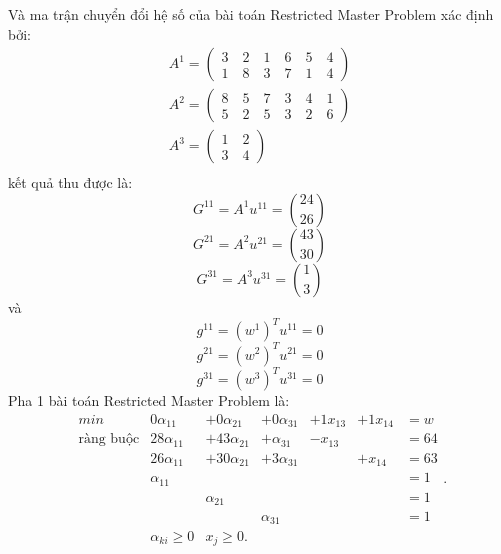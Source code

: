 Và ma trận chuyển đổi hệ số của bài toán Restricted Master Problem xác định bởi:
\begin{displaymath}
\begin{array}{llll}
 A^1 = \left(\begin{matrix} 3\quad 2\quad 1\quad 6 \quad5 \quad 4\\1\quad 8\quad 3\quad 7\quad1\quad 4\end{matrix} \right)\\
 A^2 = \left(\begin{matrix} 8\quad 5\quad 7\quad 3 \quad4 \quad 1\\5\quad 2\quad 5\quad 3\quad2\quad 6\end{matrix} \right)\\
 A^3 = \left(\begin{matrix} 1\quad 2\\3\quad4\end{matrix} \right)\\
\end{array}
\end{displaymath}
kết quả thu được là:
\begin{displaymath}G^{11}=A^{1}u^{11}=\binom{24}{26}\end{displaymath}
\begin{displaymath}G^{21}=A^{2}u^{21}=\binom{43}{30}\end{displaymath}
\begin{displaymath}G^{31}=A^{3}u^{31}=\binom{1}{3}\end{displaymath}
và
\begin{displaymath}g^{11}=(w^1)^Tu^{11}=0\end{displaymath}
\begin{displaymath}g^{21}=(w^2)^Tu^{21}=0\end{displaymath}
\begin{displaymath}g^{31}=(w^3)^Tu^{31}=0\end{displaymath}
Pha 1 bài toán Restricted Master Problem là:
\begin{equation}\label{PT1016}
\begin{array}{llllllll}
min&0\alpha_{11}&+0\alpha_{21}&+0\alpha_{31}&+1x_{13}&+1x_{14}&=w\\
\textrm{ràng buộc}&28\alpha_{11}&+43\alpha_{21}&+\alpha_{31}&-x_{13}&&=64\\
&26\alpha_{11}&+30\alpha_{21}&+3\alpha_{31}&&+x_{14}&=63\\
&\alpha_{11}&&&&&=1\\
&&\alpha_{21}&&&&=1\\
&&&\alpha_{31}&&&=1\\
&\alpha_{ki}\geq0&x_j\geq0.
\end{array}.
\end{equation}
